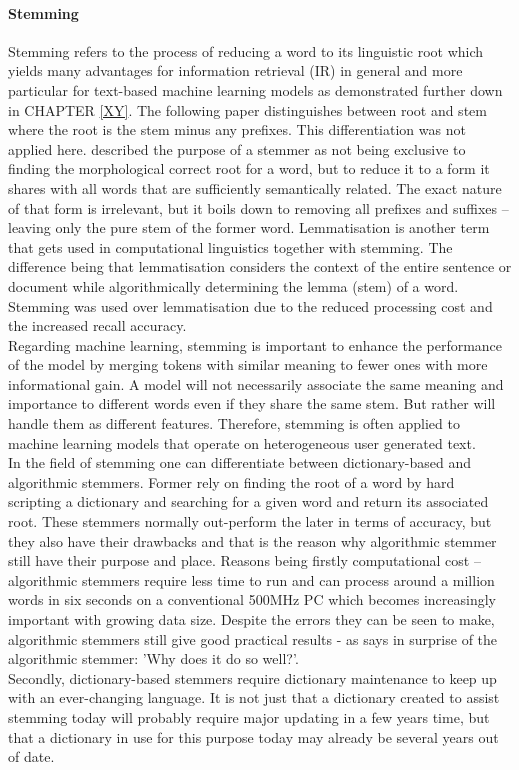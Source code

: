 \paragraph{Stemming} \label{word_stemming}
Stemming refers to the process of reducing a word to its linguistic root which yields many advantages for information retrieval (IR) in general and more particular for text-based machine learning models as demonstrated further down in CHAPTER \ref{XY}. The following paper \parencite{Lovins1968DevelopmentAlgorithm} distinguishes between root and stem where the root is the stem minus any prefixes. This differentiation was not applied here. 
\parencite{Weissweiler2018DevelopingStemmers} described the purpose of a stemmer as not being exclusive to finding the morphological correct root for a word, but to reduce it to a form it shares with all words that are sufficiently semantically related. The exact nature of that form is irrelevant, but it boils down to removing all prefixes and suffixes – leaving only the pure stem of the former word. Lemmatisation is another term that gets used in computational linguistics together with stemming. The difference being that lemmatisation considers the context of the entire sentence or document while algorithmically determining the lemma (stem) of a word. Stemming was used over lemmatisation due to the reduced processing cost and the increased recall accuracy.\\
\newline
Regarding machine learning, stemming is important to enhance the performance of the model by merging tokens with similar meaning to fewer ones with more informational gain. A model will not necessarily associate the same meaning and importance to different words even if they share the same stem. But rather will handle them as different features. Therefore, stemming is often applied to machine learning models that operate on heterogeneous user generated text.\\
\newline
In the field of stemming one can differentiate between dictionary-based and algorithmic stemmers. Former rely on finding the root of a word by hard scripting a dictionary and searching for a given word and return its associated root. These stemmers normally out-perform the later in terms of accuracy, but they also have their drawbacks and that is the reason why algorithmic stemmer still have their purpose and place.  Reasons being firstly computational cost – algorithmic stemmers require less time to run and can process around a million words in six seconds on a conventional 500MHz PC \parencite{Porter2001Snowball:Algorithms} which becomes increasingly important with growing data size. Despite the errors they can be seen to make, algorithmic stemmers still give good practical results - as \parencite{Krovetz1995WordDatabases} says in surprise of the algorithmic stemmer: 'Why does it do so well?'.\\ Secondly, dictionary-based stemmers require dictionary maintenance to keep up with an ever-changing language. It is not just that a dictionary created to assist stemming today will probably require major updating in a few years time, but that a dictionary in use for this purpose today may already be several years out of date.\\
